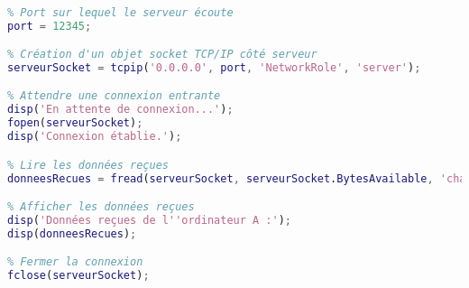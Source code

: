 \begin{lstlisting}[language=Matlab, caption={Programme MATLAB sur l'ordinateur B (recever)}]

% Port sur lequel le serveur écoute
port = 12345;

% Création d'un objet socket TCP/IP côté serveur
serveurSocket = tcpip('0.0.0.0', port, 'NetworkRole', 'server');

% Attendre une connexion entrante
disp('En attente de connexion...');
fopen(serveurSocket);
disp('Connexion établie.');

% Lire les données reçues
donneesRecues = fread(serveurSocket, serveurSocket.BytesAvailable, 'char')';

% Afficher les données reçues
disp('Données reçues de l''ordinateur A :');
disp(donneesRecues);

% Fermer la connexion
fclose(serveurSocket);

\end{lstlisting}

%



